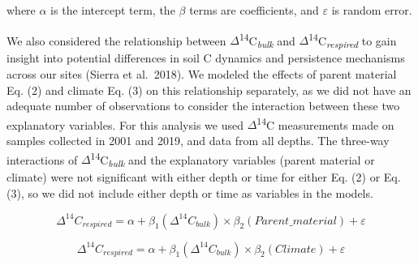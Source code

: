 \documentclass[soil, manuscript]{copernicus}
\begin{document}
where \(\alpha\) is the intercept term, the \(\beta\) terms are
coefficients, and \(\varepsilon\) is random error.

We also considered the relationship between
\(\Delta\)\textsuperscript{14}C\textsubscript{\emph{bulk}} and
\(\Delta\)\textsuperscript{14}C\textsubscript{\emph{respired}} to gain
insight into potential differences in soil C dynamics and persistence
mechanisms across our sites (Sierra et al.~2018). We modeled the effects
of parent material Eq. (2) and climate Eq. (3) on this relationship
separately, as we did not have an adequate number of observations to
consider the interaction between these two explanatory variables. For
this analysis we used \(\Delta\)\textsuperscript{14}C measurements made
on samples collected in 2001 and 2019, and data from all depths. The
three-way interactions of
\(\Delta\)\textsuperscript{14}C\textsubscript{\emph{bulk}} and the
explanatory variables (parent material or climate) were not significant
with either depth or time for either Eq. (2) or Eq. (3), so we did not
include either depth or time as variables in the models.

\begin{equation}
\Delta^{14}C_{respired} = \alpha + \beta_{1}(\Delta^{14}C_{bulk}) \times \beta_{2}(Parent\_material) + \varepsilon
\end{equation}

\begin{equation}
\Delta^{14}C_{respired} = \alpha + \beta_{1}(\Delta^{14}C_{bulk}) \times \beta_{2}(Climate) + \varepsilon
\end{equation}
\end{document}
